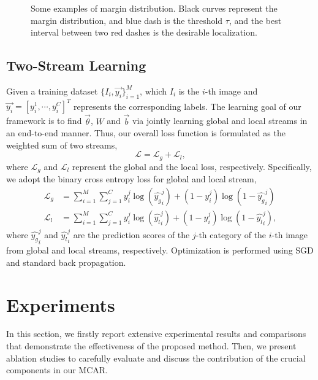 \documentclass[journal]{IEEEtran}
\begin{document}
\begin{figure}[t]
 \centering
  \hspace{15pt}
 \hspace{15pt}
\caption{Some examples of margin distribution. Black curves represent the margin distribution, and blue dash is the threshold $\tau$, and the best interval between two red dashes is the desirable localization. } \label{fig:loceg}
\end{figure}

\subsection{Two-Stream Learning}
Given a training dataset $\{I_i, \vec {y_i}\}_{i=1}^M$, which $I_i$ is the $i$-th image and $\vec {y_i}=[y_i^1, \cdots, y_i^C]^T$ represents the corresponding labels. The learning goal of our framework
is to find $\vec \theta$, $W$ and $\vec b$ via jointly learning global and local streams in an end-to-end manner. Thus, our overall loss function is formulated as the weighted sum of two streams,
 \begin{equation}\label{eq:loss}
 \mathcal L = \mathcal {L}_g + \mathcal {L}_l,
 \end{equation}
 where $\mathcal {L}_g$ and $\mathcal{L}_l$ represent the global and the local loss, respectively. Specifically, we adopt the binary cross entropy loss for global and local stream,
  \begin{equation}
   \begin{aligned}
\mathcal {L}_g &= \sum_{i=1}^{M}\sum_{j=1}^{C} y_i^j \log(\hat {y_g}_i^j) + (1- y_i^j)\log(1-\hat {y_g}_i^j)\\
\mathcal {L}_l &= \sum_{i=1}^{M}\sum_{j=1}^{C} y_i^j \log(\hat {y_l}_i^j) + (1- y_i^j)\log(1-\hat {y_l}_i^j),
 \end{aligned}
 \end{equation}
 where $\hat {y_g}_i^j$ and $\hat {y_l}_i^j$ are the prediction scores of the $j$-th category of the $i$-th image from global and local streams, respectively. Optimization is performed using SGD and standard back propagation.
 

\section{Experiments}\label{exps}
In this section, we firstly report extensive experimental results and comparisons that demonstrate the effectiveness of the proposed method. Then, we present ablation studies to carefully evaluate and discuss the contribution of the crucial components in our MCAR. 
\end{document}
